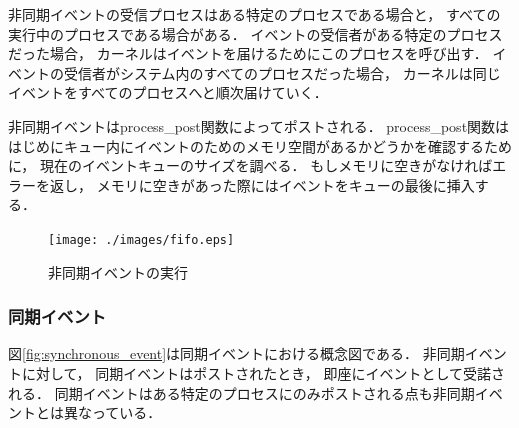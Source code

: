 非同期イベントの受信プロセスはある特定のプロセスである場合と，
すべての実行中のプロセスである場合がある．
イベントの受信者がある特定のプロセスだった場合，
カーネルはイベントを届けるためにこのプロセスを呼び出す．
イベントの受信者がシステム内のすべてのプロセスだった場合，
カーネルは同じイベントをすべてのプロセスへと順次届けていく．

非同期イベントはprocess\_post関数によってポストされる．
process\_post関数ははじめにキュー内にイベントのためのメモリ空間があるかどうかを確認するために，
現在のイベントキューのサイズを調べる．
もしメモリに空きがなければエラーを返し，
メモリに空きがあった際にはイベントをキューの最後に挿入する．


\begin{figure}[htbp]
 \begin{center}
  \texttt{[image: ./images/fifo.eps]}
 \end{center}
 \caption{非同期イベントの実行}
 \label{fig:asynchronous_event}
\end{figure}




\subsubsection{同期イベント}

\vspace{0.5em}図\ref{fig:synchronous_event}は同期イベントにおける概念図である．
非同期イベントに対して，
同期イベントはポストされたとき，
即座にイベントとして受諾される．
同期イベントはある特定のプロセスにのみポストされる点も非同期イベントとは異なっている．

